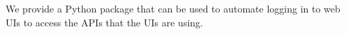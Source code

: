 We provide a Python package that can be used to automate logging in to web UIs 
to access the APIs that the UIs are using.
